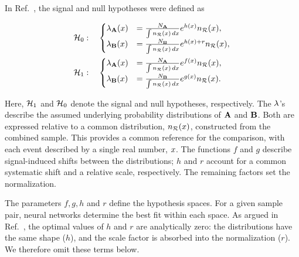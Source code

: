 \documentclass[paper/ddppaper2.tex]{subfiles}
\begin{document}
In Ref.~\cite{LastDDPPaper}, the signal and null hypotheses were defined as

\begin{equation}
\label{eq:last_ddp_paper_hypotheses}
\begin{aligned}
    \nullhypothesis &: \quad
    \begin{cases}
        \pdf_{\dataset{A}}(\eventsymbol)
        &=
        \frac{N_{\dataset{A}}}
            {\int \refdist[\eventsymbol]\,d\eventsymbol}
        e^{h(\eventsymbol)} \refdist[\eventsymbol],
        \\
        \pdf_{\dataset{B}}(\eventsymbol)
        &=
        \frac{N_{\dataset{B}}}
            {\int \refdist[\eventsymbol]\,d\eventsymbol}
        e^{h(\eventsymbol)+r} \refdist[\eventsymbol],
    \end{cases} \\
    \hypothesis{1} &: \quad
    \begin{cases}
        \pdf_{\dataset{A}}(\eventsymbol)
        &=
        \frac{N_{\dataset{A}}}
            {\int \refdist[\eventsymbol]\,d\eventsymbol}
        e^{f(\eventsymbol)} \refdist[\eventsymbol],
        \\
        \pdf_{\dataset{B}}(\eventsymbol)
        &=
        \frac{N_{\dataset{B}}}
            {\int \refdist[\eventsymbol]\,d\eventsymbol}
        e^{g(\eventsymbol)} \refdist[\eventsymbol].
    \end{cases}
\end{aligned}
\end{equation}

\noindent Here, $\hypothesis{1}$ and $\nullhypothesis$ denote the signal and null hypotheses, respectively. The $\pdf$'s describe the assumed underlying probability distributions of $\dataset{A}$ and $\dataset{B}$. Both are expressed relative to a common distribution, $\refdist[\eventsymbol]$, constructed from the combined sample. This provides a common reference for the comparison, with each event described by a single real number, $\eventsymbol$. The functions $f$ and $g$ describe signal-induced shifts between the distributions; $h$ and $r$ account for a common systematic shift and a relative scale, respectively. The remaining factors set the normalization.

The parameters $f, g, h$ and $r$ define the hypothesis spaces. For a given sample pair, neural networks determine the best fit within each space. As argued in Ref.~\cite{LastDDPPaper}, the optimal values of $h$ and $r$ are analytically zero: the distributions have the same shape ($h$), and the scale factor is absorbed into the normalization ($r$). We therefore omit these terms below.
\end{document}
